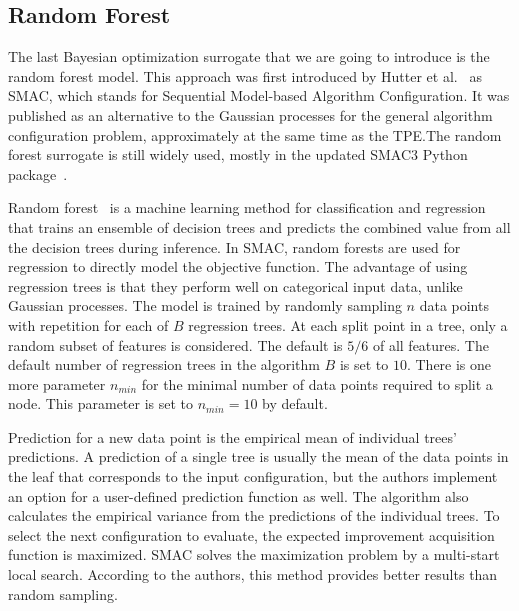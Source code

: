 \subsection{Random Forest}
The last Bayesian optimization surrogate that we are going to introduce is the random forest model. This approach was first introduced by Hutter et al.~\cite{hutter2010sequential} as SMAC, which stands for Sequential Model-based Algorithm Configuration. It was published as an alternative to the Gaussian processes for the general algorithm configuration problem, approximately at the same time as the TPE.\@ The random forest surrogate is still widely used, mostly in the updated SMAC3 Python package~\cite{smac3}.

Random forest~\cite{breiman2001random} is a machine learning method for classification and regression that trains an ensemble of decision trees and predicts the combined value from all the decision trees during inference. In SMAC, random forests are used for regression to directly model the objective function. The advantage of using regression trees is that they perform well on categorical input data, unlike Gaussian processes. The model is trained by randomly sampling $n$ data points with repetition for each of $B$ regression trees. At each split point in a tree, only a random subset of features is considered. The default is $5/6$ of all features. The default number of regression trees in the algorithm $B$ is set to $10$. There is one more parameter $n_{min}$ for the minimal number of data points required to split a node. This parameter is set to $n_{min}=10$ by default.

Prediction for a new data point is the empirical mean of individual trees' predictions. A prediction of a single tree is usually the mean of the data points in the leaf that corresponds to the input configuration, but the authors implement an option for a user-defined prediction function as well. The algorithm also calculates the empirical variance from the predictions of the individual trees. To select the next configuration to evaluate, the expected improvement acquisition function is maximized. SMAC solves the maximization problem by a multi-start local search. According to the authors, this method provides better results than random sampling.
